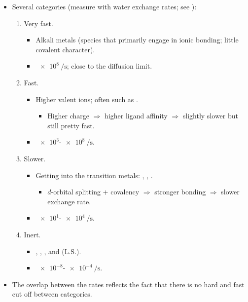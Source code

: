 \documentclass[../notes.tex]{subfiles}
\begin{document}
\begin{itemize}
    \item Several categories (measure with water exchange rates; see \textcite{bib:CHEM20100Notes}):
    \begin{enumerate}[label={\Roman*)}]
        \item Very fast.
        \begin{itemize}
            \item Alkali metals (species that primarily engage in ionic bonding; little covalent character).
            \item $\SI{e8}{\per\second}$; close to the diffusion limit.
        \end{itemize}
        \item Fast.
        \begin{itemize}
            \item Higher valent ions; often  such as .
            \begin{itemize}
                \item Higher charge $\Rightarrow$ higher ligand affinity $\Rightarrow$ slightly slower but still pretty fast.
            \end{itemize}
            \item $\num{e3}$-$\SI{e8}{\per\second}$.
        \end{itemize}
        \item Slower.
        \begin{itemize}
            \item Getting into the transition metals: , , .
            \begin{itemize}
                \item $d$-orbital splitting $+$ covalency $\Rightarrow$ stronger bonding $\Rightarrow$ slower exchange rate.
            \end{itemize}
            \item $\num{e1}$-$\SI{e4}{\per\second}$.
        \end{itemize}
        \item Inert.
        \begin{itemize}
            \item {}, , , and (L.S.).
            \item $\num{e-8}$-$\SI{e-4}{\per\second}$.
        \end{itemize}
    \end{enumerate}
    \item The overlap between the rates reflects the fact that there is no hard and fast cut off between categories.

\end{itemize}
\end{document}
